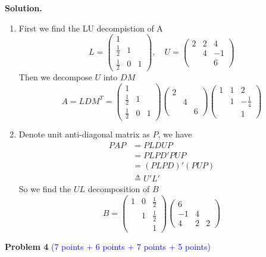 \documentclass[english,onecolumn]{IEEEtran}
\begin{document}
\noindent\textbf{Solution.}
\begin{enumerate}
    \item First we find the LU decompistion of A
    $$L= \begin{pmatrix}
    1 &  &  \\ 
    \frac{1}{2} & 1 &  \\ 
    \frac{1}{2} & 0 & 1
    \end{pmatrix}, \quad U=\begin{pmatrix}
    2 & 2 & 4 \\ 
    & 4 & -1 \\ 
    &  & 6
    \end{pmatrix} $$
    Then we decompose $U$ into $DM$
    $$A=LDM^T=\begin{pmatrix}
1 &  &  \\ 
\frac{1}{2} & 1 &  \\ 
\frac{1}{2} & 0 & 1
\end{pmatrix}\begin{pmatrix}
2 &  &  \\ 
& 4 &  \\ 
&  & 6
\end{pmatrix} \begin{pmatrix}
1 & 1 & 2 \\ 
& 1 & -\frac{1}{4} \\ 
&  & 1
\end{pmatrix} $$
    \item Denote unit anti-diagonal matrix as $P$, we have
    \begin{align*}
    PAP &= PLDUP\\
    &= PLPD'PUP\\
    &=(PLPD)'(PUP)\\
    &\triangleq  U'L'
    \end{align*}
    So we find the $UL$ decomposition of $B$
    $$B=\begin{pmatrix}
    1 & 0 & \frac{1}{2} \\ 
    & 1 & \frac{1}{2} \\ 
    &  & 1
    \end{pmatrix}\begin{pmatrix}
    6 &  &  \\ 
    -1 & 4 &  \\ 
    4 & 2 & 2
    \end{pmatrix}  $$
\end{enumerate}

\newpage
\noindent\textbf{Problem 4} \textcolor{blue}{(7 points + 6 points + 7 points + 5 points)}
\end{document}
